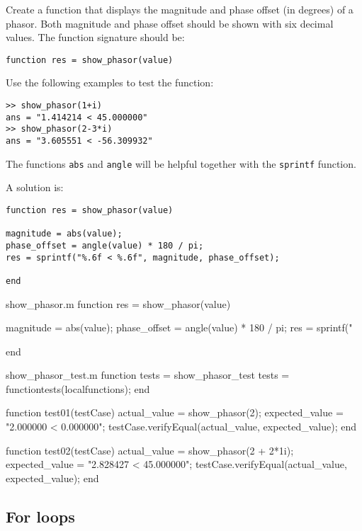 \begin{ex}
Create a function that displays the magnitude and 
phase offset (in degrees) of a phasor.
Both magnitude and phase offset should be shown with six 
decimal values.
The function signature should be:
\begin{lstlisting}
function res = show_phasor(value)
\end{lstlisting}
Use the following examples to test the function:
\begin{lstlisting}
>> show_phasor(1+i)
ans = "1.414214 < 45.000000"
>> show_phasor(2-3*i)
ans = "3.605551 < -56.309932"
\end{lstlisting}
\begin{hint}
The functions \verb!abs! and \verb!angle! will be helpful together with the \verb!sprintf! function.
\end{hint}
\begin{sol}
A solution is:
\begin{lstlisting}
function res = show_phasor(value)

magnitude = abs(value);
phase_offset = angle(value) * 180 / pi;
res = sprintf("%.6f < %.6f", magnitude, phase_offset);

end
\end{lstlisting}
\end{sol}
\begin{solutionfile}{show_phasor.m}
function res = show_phasor(value)

magnitude = abs(value);
phase_offset = angle(value) * 180 / pi;
res = sprintf("%

end
\end{solutionfile}
\begin{solutionfile}{show_phasor_test.m}
function tests = show_phasor_test
    tests = functiontests(localfunctions);
end


function test01(testCase)
    actual_value = show_phasor(2);
    expected_value = "2.000000 < 0.000000";
    testCase.verifyEqual(actual_value, expected_value);
end

function test02(testCase)
    actual_value = show_phasor(2 + 2*1i);
    expected_value = "2.828427 < 45.000000";
    testCase.verifyEqual(actual_value, expected_value);
end
\end{solutionfile}
\end{ex}


\subsection{For loops}

